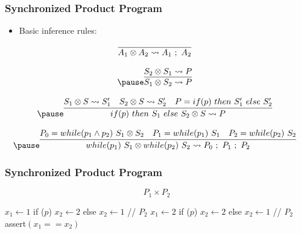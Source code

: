 \documentclass{beamer} %
\theoremstyle{definition} %
\newcommand{\cross}{\otimes{}}
\begin{document}
\begin{frame}
    \frametitle{Synchronized Product Program}
    
       \begin{itemize}
           \item Basic inference rules:
       \end{itemize}

    
        \[
            \begin{array}{c}
                \infer[]{A_1 \cross A_2 \leadsto A_1\ ;\ A_2}{} \\ \\
                \pause
                \infer[]{S_1 \cross S_2 \leadsto P}{
                    S_2 \cross S_1 \leadsto P
                } \\ \\
                \pause
                \infer[]{if(p)\ then\ S_1\ else\ S_2 \cross S \leadsto P}{
                    \text{$S_1 \cross S \leadsto S_1'$} &
                    \text{$S_2 \cross S \leadsto S_2'$} &
                    \text{$P = if(p)\ then\ S_1'\ else\ S_2'$}
                } \\ \\
                \pause
                \infer[]{while(p_1)\ S_1 \cross while(p_2)\ S_2 \leadsto P_0\ ;\ P_1\ ;\ P_2}{
                    \text{$P_0 = while(p_1 \land p_2)\ S_1 \cross S_2$} &
                    \text{$P_1 = while(p_1)\ S_1$} &
                    \text{$P_2 = while(p_2)\ S_2$}
                }
            \end{array}
        \]
        
    \end{frame}

    \begin{frame}
        \frametitle{Synchronized Product Program}
        $$P_1 \times P_2$$
        \begin{center}
            \begin{minipage}{0.65\linewidth}
            
            \begin{algorithm}[H]
                \begin{algorithmic}
                        \State $x_1 \gets 1$
                        \State if ($p$) $x_2 \gets 2$ else $x_2 \gets 1$ // $P_2$
                    \Else
                        \State $x_1 \gets 2$
                        \State if ($p$) $x_2 \gets 2$ else $x_2 \gets 1$ // $P_2$
                    \EndIf
                    \State \textsf{assert}$(x_1 == x_2)$
                \end{algorithmic}
            \end{algorithm}
        \end{minipage}
        \end{center}
        
    \end{frame}
\end{document}
